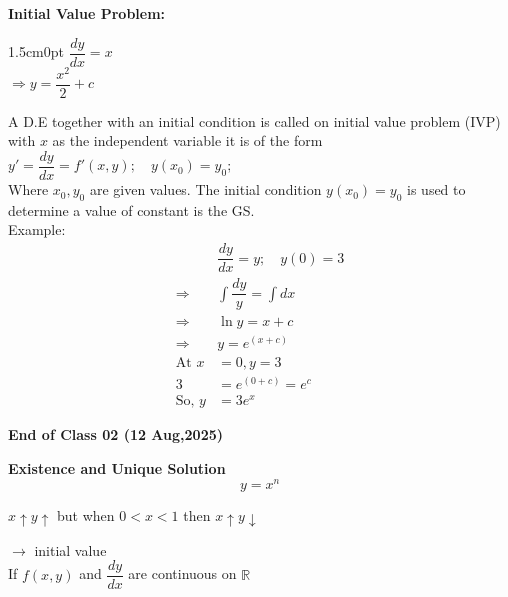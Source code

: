 \documentclass[a4aper,12pt]{report}
\begin{document}
\noindent \textbf{Initial Value Problem: } 
\begin{adjustwidth}{1.5cm}{0pt}
    $\dfrac{dy}{dx}=x$ \\ 
    $\Rightarrow y = \dfrac{x^2}{2}+c$
\end{adjustwidth}
A D.E together with an initial condition is called on initial value problem (IVP) with $x$ as the independent variable it is of the form $y' = \dfrac{dy}{dx} = f'(x,y);\quad y(x_0) = y_0;$ \\ [5pt]
Where $x_0,y_0$ are given values. The initial condition $y(x_0)=y_0$ is used to determine a value of constant is the GS. \\ [5pt]
Example: 
\begin{align*}
    &\dfrac{dy}{dx} = y; \quad y(0) = 3 \\ 
    \Rightarrow \,\, & \int \dfrac{dy}{y} = \int dx \\ 
    \Rightarrow\,\, & \ln y = x+c \\ 
    \Rightarrow \,\, &y = e^{(x+c)} \\ 
    \text{At }  x&=0, y =3 \\ 
    3 &= e^{(0+c)} = e^c \\ 
    \text{So, }y &= 3e^x
\end{align*}
\begin{flushright}
    {\small \textbf{End of Class 02 (12 Aug,2025)}}
\end{flushright}
\newpage
\noindent\textbf{\large Existence and Unique Solution} 
$$y = x^n$$
\begin{center}
    $x\uparrow y\uparrow$ but when $0 < x < 1$ then $x\uparrow y\downarrow$
\end{center}
 $\longrightarrow$ initial value \\
If $f(x,y)$ and $\dfrac{dy}{dx}$ are continuous on $\mathbb{R}$
\end{document}
